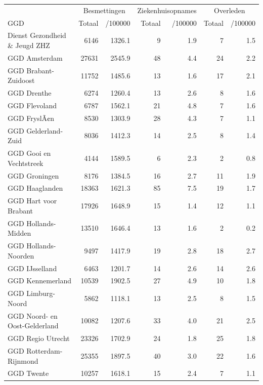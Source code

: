 \documentclass[
  english,
  man,floatsintext]{apa6}
\begin{document}
\begin{table}
\centering\begingroup\fontsize{10}{12}\selectfont

\begin{threeparttable}
\begin{tabular}{lrrrrrr}
\toprule
\multicolumn{1}{c}{ } & \multicolumn{2}{c}{Besmettingen} & \multicolumn{2}{c}{Ziekenhuisopnames} & \multicolumn{2}{c}{Overleden} \\
\cmidrule(l{3pt}r{3pt}){2-3} \cmidrule(l{3pt}r{3pt}){4-5} \cmidrule(l{3pt}r{3pt}){6-7}
GGD & Totaal & /100000 & Totaal & /100000 & Totaal & /100000\\
\midrule
Dienst Gezondheid \& Jeugd ZHZ & 6146 & 1326.1 & 9 & 1.9 & 7 & 1.5\\
GGD Amsterdam & 27631 & 2545.9 & 48 & 4.4 & 24 & 2.2\\
GGD Brabant-Zuidoost & 11752 & 1485.6 & 13 & 1.6 & 17 & 2.1\\
GGD Drenthe & 6274 & 1260.4 & 13 & 2.6 & 8 & 1.6\\
GGD Flevoland & 6787 & 1562.1 & 21 & 4.8 & 7 & 1.6\\
GGD FryslÃ¢n & 8530 & 1303.9 & 28 & 4.3 & 7 & 1.1\\
GGD Gelderland-Zuid & 8036 & 1412.3 & 14 & 2.5 & 8 & 1.4\\
GGD Gooi en Vechtstreek & 4144 & 1589.5 & 6 & 2.3 & 2 & 0.8\\
GGD Groningen & 8176 & 1384.5 & 16 & 2.7 & 11 & 1.9\\
GGD Haaglanden & 18363 & 1621.3 & 85 & 7.5 & 19 & 1.7\\
GGD Hart voor Brabant & 17926 & 1648.9 & 15 & 1.4 & 12 & 1.1\\
GGD Hollands-Midden & 13510 & 1646.4 & 13 & 1.6 & 2 & 0.2\\
GGD Hollands-Noorden & 9497 & 1417.9 & 19 & 2.8 & 18 & 2.7\\
GGD IJsselland & 6463 & 1201.7 & 14 & 2.6 & 14 & 2.6\\
GGD Kennemerland & 10539 & 1902.5 & 27 & 4.9 & 10 & 1.8\\
GGD Limburg-Noord & 5862 & 1118.1 & 13 & 2.5 & 8 & 1.5\\
GGD Noord- en Oost-Gelderland & 10082 & 1207.6 & 33 & 4.0 & 21 & 2.5\\
GGD Regio Utrecht & 23326 & 1702.9 & 24 & 1.8 & 25 & 1.8\\
GGD Rotterdam-Rijnmond & 25355 & 1897.5 & 40 & 3.0 & 22 & 1.6\\
GGD Twente & 10257 & 1618.1 & 15 & 2.4 & 7 & 1.1\\

\end{tabular}
\end{threeparttable}
\end{table}
\end{document}
